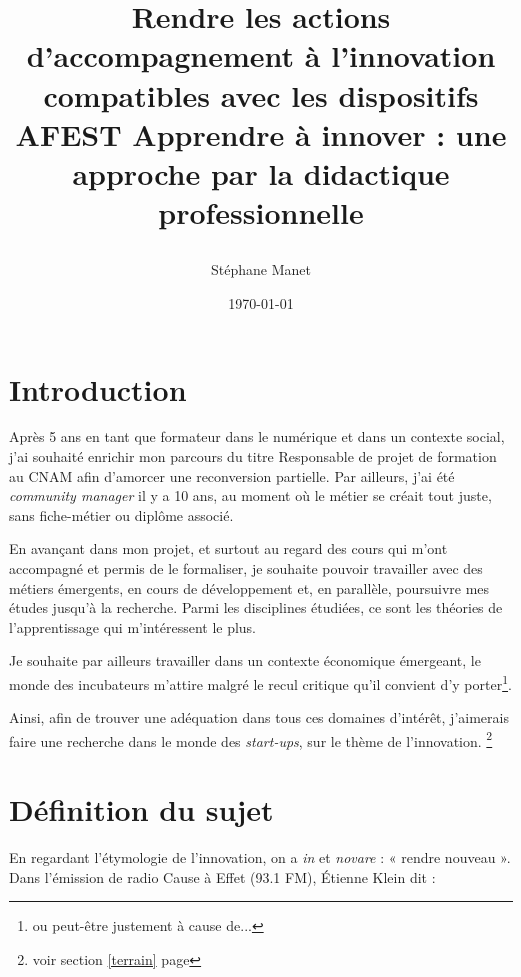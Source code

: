 \documentclass{article}
\author{Stéphane Manet}
\date{\today}
\title{%
    \begin{minipage}\linewidth
        \centering\bfseries
        Rendre les actions d'accompagnement à l'innovation compatibles avec les dispositifs AFEST
        \vskip3pt
        \large Apprendre à innover : une approche par la didactique professionnelle
    \end{minipage}
}
\begin{document}
\maketitle %
\tableofcontents


\pagebreak

\section*{Introduction}

Après 5 ans en tant que formateur dans le numérique et dans un contexte social, j'ai souhaité enrichir mon parcours du titre Responsable de projet de formation au CNAM afin d'amorcer une reconversion partielle. 
Par ailleurs, j'ai été \emph{community manager} il y a 10 ans, au moment où le métier se créait tout juste, sans fiche-métier ou diplôme associé. 

En avançant dans mon projet, et surtout au regard des cours qui m'ont accompagné et permis de le formaliser, je souhaite pouvoir travailler avec des métiers émergents, en cours de développement et, en parallèle, poursuivre mes études jusqu'à la recherche. Parmi les disciplines étudiées, ce sont les théories de l'apprentissage qui m'intéressent le plus.

Je souhaite par ailleurs travailler dans un contexte économique émergeant, le monde des incubateurs m'attire malgré le recul critique qu'il convient d'y porter\footnote{ou peut-être justement à cause de...}. 

Ainsi, afin de trouver une adéquation dans tous ces domaines d'intérêt, j'aimerais faire une recherche dans le monde des \emph{start-ups}, sur le thème de l'innovation. \footnote{voir section \ref{terrain} page \pageref{terrain}}

\section{Définition du sujet}

En regardant l'étymologie de l'innovation, on a \emph{in} et \emph{novare} : « rendre nouveau ». Dans l'émission de radio Cause à Effet (93.1 FM), Étienne Klein dit :
\end{document}
